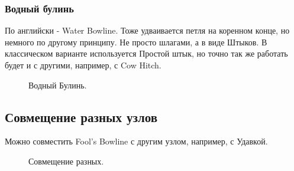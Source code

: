 \subsubsection*{Водный булинь}

По английски - Water Bowline. Тоже удваивается петля на коренном конце, но немного по другому принципу. Не просто шлагами, а в виде Штыков. В классическом варианте используется Простой штык, но точно так же работать будет и с другими, например, с Cow Hitch.

\begin{figure}[H]\centering
\end{figure}

\begin{figure}[H]\centering
	\caption{Водный Булинь.}\label{ris:Besedochny-Water}
\end{figure}

\subsection*{Совмещение разных узлов}

Можно совместить Fool's Bowline с другим узлом, например, с Удавкой.

\begin{figure}[H]\centering
	\begin{minipage}{1\linewidth}
		\begin{center}
			\tcbox[enhanced jigsaw,colframe=black,opacityframe=0.5,opacityback=0.5]
			{\centering{}}
		\end{center}
	\end{minipage}
\caption{Совмещение разных.}
\label{ris:Besedochny-udav}
\end{figure}
